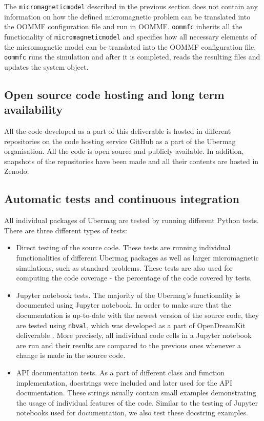 \documentclass{deliverablereport}
\begin{document}
The \texttt{micromagneticmodel} described in the previous section does not
contain any information on how the defined micromagnetic problem can
be translated into the OOMMF configuration file and run in
OOMMF. \texttt{oommfc} inherits all the functionality of
\texttt{micromagneticmodel} and specifies how all necessary elements
of the micromagnetic model can be translated into the OOMMF
configuration file. \texttt{oommfc} runs the simulation and after it
is completed, reads the resulting files and updates the system object.

\subsection{Open source code hosting and long term availability}

All the code developed as a part of this deliverable is hosted in
different repositories on the code hosting service GitHub as a part of
the Ubermag organisation. All the code is open source and publicly
available. In addition, snapshots of the repositories have been made
and all their contents are hosted in Zenodo.

\subsection{Automatic tests and continuous integration}

All individual packages of Ubermag are tested by running different
Python tests. There are three different types of tests:

\begin{itemize}
\item Direct testing of the source code. These tests are running
individual functionalities of different Ubermag packages as well as
larger micromagnetic simulations, such as standard problems. These
tests are also used for computing the code coverage - the percentage
of the code covered by tests.
\item Jupyter notebook tests. The majority of the Ubermag's
functionality is documented using Jupyter notebook. In order to make
sure that the documentation is up-to-date with the newest version of
the source code, they are tested using \texttt{nbval}, which was
developed as a part of OpenDreamKit deliverable
. More precisely, all individual code cells
in a Jupyter notebook are run and their results are compared to the
previous ones whenever a change is made in the source code.
\item API documentation tests. As a part of different class and
  function implementation, docstrings were included and later used for
  the API documentation. These strings usually contain small examples
  demonstrating the usage of individual features of the code. Similar
  to the testing of Jupyter notebooks used for documentation, we also
  test these docstring examples.
\end{itemize}
\end{document}
